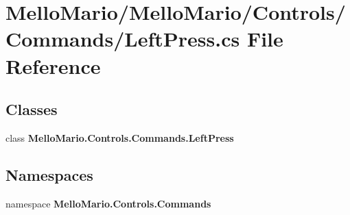 \section{Mello\+Mario/\+Mello\+Mario/\+Controls/\+Commands/\+Left\+Press.cs File Reference}
\label{LeftPress_8cs}
\subsection*{Classes}
\begin{DoxyCompactItemize}
\item 
class \textbf{ Mello\+Mario.\+Controls.\+Commands.\+Left\+Press}
\end{DoxyCompactItemize}
\subsection*{Namespaces}
\begin{DoxyCompactItemize}
\item 
namespace \textbf{ Mello\+Mario.\+Controls.\+Commands}
\end{DoxyCompactItemize}

